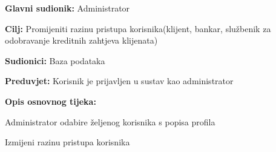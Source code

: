							
			
			\noindent {}
			\begin{packed_item}
				
				\item \textbf{Glavni sudionik: }Administrator
				\item  \textbf{Cilj:} Promijeniti razinu pristupa korisnika(klijent, bankar, službenik za odobravanje kreditnih zahtjeva klijenata)
				\item  \textbf{Sudionici:} Baza podataka
				\item  \textbf{Preduvjet:} Korisnik je prijavljen u sustav kao administrator
				\item  \textbf{Opis osnovnog tijeka:}
				
				\item[] \begin{packed_enum}
					
					\item Administrator odabire željenog korisnika s popisa profila
					\item Izmijeni razinu pristupa korisnika
					
					
				\end{packed_enum}
				
			\end{packed_item}
			
